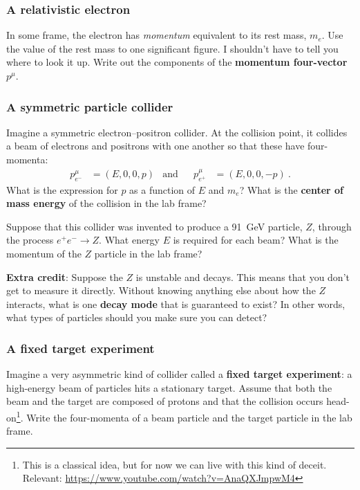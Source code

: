 \documentclass[12pt]{article}
\numberwithin{equation}{section}    %
\begin{document}
\subsubsection{A relativistic electron}

In some frame, the electron has \emph{momentum} equivalent to its rest mass, $m_e$. Use the value of the rest mass to one significant figure. I shouldn't have to tell you where to look it up. Write out the components of the \textbf{momentum four-vector} $p^\mu$. 

\subsubsection{A symmetric particle collider}

Imagine a symmetric electron--positron collider. At the collision point, it collides a beam of electrons and positrons with one another so that these have four-momenta:
\begin{align}
	p^\mu_{e^-} &= (E,0,0,p)
	&
	\text{and}
	&&
	p^\mu_{e^+} &= (E,0,0,-p) \ .
\end{align}
What is the expression for $p$ as a function of $E$ and $m_e$? What is the \textbf{center of mass energy} of the collision in the lab frame?

Suppose that this collider was invented to produce a 91~GeV particle, $Z$, through the process $e^+ e^- \to Z$. What energy $E$ is required for each beam? What is the momentum of the $Z$ particle in the lab frame?

\textbf{Extra credit}: Suppose the $Z$ is unstable and decays. This means that you don't get to measure it directly. Without knowing anything else about how the $Z$ interacts, what is one \textbf{decay mode} that is guaranteed to exist? In other words, what types of particles should you make sure you can detect? 

\subsubsection{A fixed target experiment}


Imagine a very asymmetric kind of collider called a \textbf{fixed target experiment}: a high-energy beam of particles hits a stationary target. Assume that both the beam and the target are composed of protons and that the collision occurs head-on\footnote{This is a classical idea, but for now we can live with this kind of deceit. Relevant: \url{https://www.youtube.com/watch?v=AnaQXJmpwM4}}. Write the four-momenta of a beam particle and the target particle in the lab frame. 
\end{document}
